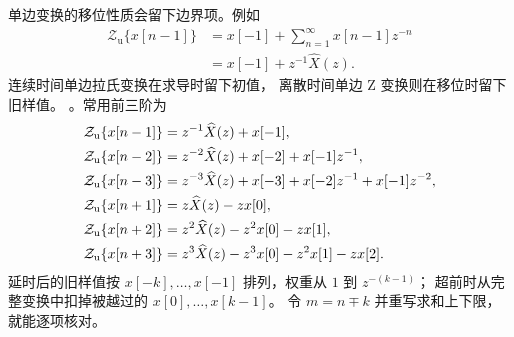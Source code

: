 单边变换的移位性质会留下边界项。例如
\begin{align*}
  \mathcal Z_{\mathrm u}\{x[n-1]\}
    &=x[-1]+\sum_{n=1}^{\infty}x[n-1]z^{-n}\\
    &=x[-1]+z^{-1}\widehat X(z).
\end{align*}
连续时间单边拉氏变换在求导时留下初值，
离散时间单边 Z 变换则在移位时留下旧样值。
。常用前三阶为
\begin{align}
  \mathcal Z_{\mathrm u}\{x[n-1]\}
    &=z^{-1}\widehat X(z)+x[-1],\notag\\
  \mathcal Z_{\mathrm u}\{x[n-2]\}
    &=z^{-2}\widehat X(z)+x[-2]+x[-1]z^{-1},\notag\\
  \mathcal Z_{\mathrm u}\{x[n-3]\}
    &=z^{-3}\widehat X(z)+x[-3]+x[-2]z^{-1}+x[-1]z^{-2},
    \label{eq:z-unilateral-delays}\\
  \mathcal Z_{\mathrm u}\{x[n+1]\}
    &=z\widehat X(z)-zx[0],\notag\\
  \mathcal Z_{\mathrm u}\{x[n+2]\}
    &=z^2\widehat X(z)-z^2x[0]-zx[1],\notag\\
  \mathcal Z_{\mathrm u}\{x[n+3]\}
    &=z^3\widehat X(z)-z^3x[0]-z^2x[1]-zx[2].
    \label{eq:z-unilateral-advances}
\end{align}
延时后的旧样值按 $x[-k],\ldots,x[-1]$ 排列，权重从 $1$ 到 $z^{-(k-1)}$；
超前时从完整变换中扣掉被越过的 $x[0],\ldots,x[k-1]$。
令 $m=n\mp k$ 并重写求和上下限，就能逐项核对。


